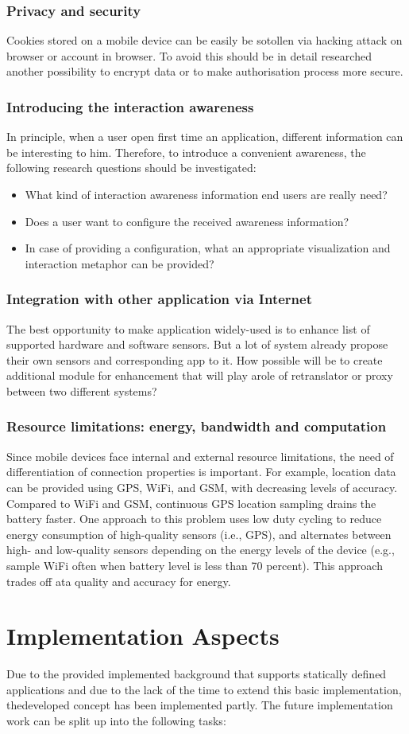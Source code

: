 		\subsubsection{Privacy and security}
		Cookies stored on a mobile device can be easily be sotollen via hacking attack on browser or account in browser. To avoid this should be in detail researched another possibility to encrypt data or to make authorisation process more secure.
		\subsubsection {Introducing the interaction awareness}
		 In principle, when a user open first time an application, different information can be interesting to him. Therefore, to introduce a convenient awareness, the following research questions should be investigated:
		 \begin{itemize}
		\item What kind of interaction awareness information end users are really need?
		\item Does a user want to configure the received awareness information?
		\item In case of providing a configuration, what an appropriate visualization and interaction metaphor can be provided? 
		\end{itemize}
		\subsubsection {Integration with other application via Internet}
		 The best opportunity to make application widely-used is to enhance list of supported hardware and software sensors. But a lot of system already propose their own sensors and corresponding app to it. How possible will be to create additional module for enhancement that will play arole of retranslator or proxy between two different systems?
		\subsubsection {Resource limitations: energy, bandwidth and computation}
		Since mobile devices face internal and external resource limitations, the need of differentiation of connection properties is important. For example, location data can be provided using GPS, WiFi, and GSM, with decreasing levels of accuracy. Compared to WiFi and GSM, continuous GPS location sampling drains the battery faster. One approach to this problem uses low duty cycling to reduce energy consumption of high-quality sensors (i.e., GPS), and alternates between high- and low-quality sensors depending on the energy levels of the device (e.g., sample WiFi often when battery level is less than 70 percent). This approach trades off ata quality and accuracy for energy. 

\section {Implementation Aspects}
	Due to the provided implemented background that supports statically defined applications and due to the lack of the time to extend this basic implementation, thedeveloped concept has been implemented partly. The future implementation work can be split up into the following tasks:
